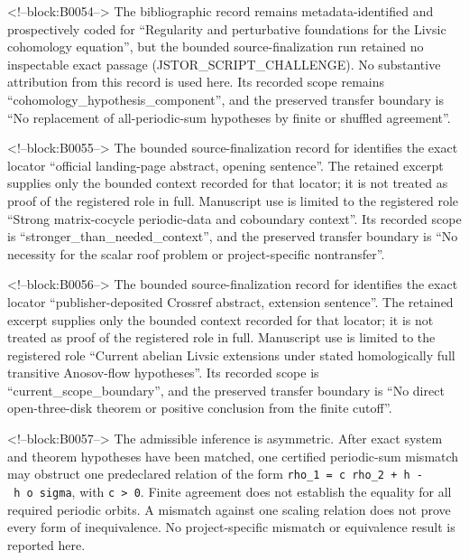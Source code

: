 \documentclass[11pt,a4paper]{article}
\begin{document}
<!--block:B0054-->
The bibliographic record \citep{P30-S24} remains metadata-identified and
prospectively coded for ``Regularity and perturbative foundations for the Livsic cohomology equation'', but the bounded source-finalization
run retained no inspectable exact passage (JSTOR\_SCRIPT\_CHALLENGE).  No substantive
attribution from this record is used here.  Its recorded scope remains
``cohomology\_hypothesis\_component'', and the preserved transfer boundary is ``No replacement of all-periodic-sum hypotheses by finite or shuffled agreement''.

<!--block:B0055-->
The bounded source-finalization record for \citep{P30-S25} identifies
the exact locator ``official landing-page abstract, opening sentence''.  The retained excerpt supplies only the
bounded context recorded for that locator; it is not treated as proof of the
registered role in full.  Manuscript use is limited to the registered role ``Strong matrix-cocycle periodic-data and coboundary context''.
Its recorded scope is ``stronger\_than\_needed\_context'', and the preserved
transfer boundary is ``No necessity for the scalar roof problem or project-specific nontransfer''.

<!--block:B0056-->
The bounded source-finalization record for \citep{P30-S26} identifies
the exact locator ``publisher-deposited Crossref abstract, extension sentence''.  The retained excerpt supplies only the
bounded context recorded for that locator; it is not treated as proof of the
registered role in full.  Manuscript use is limited to the registered role ``Current abelian Livsic extensions under stated homologically full transitive Anosov-flow hypotheses''.
Its recorded scope is ``current\_scope\_boundary'', and the preserved
transfer boundary is ``No direct open-three-disk theorem or positive conclusion from the finite cutoff''.

<!--block:B0057-->
The admissible inference is asymmetric. After exact system and theorem hypotheses have been matched, one certified periodic-sum mismatch may obstruct one predeclared relation of the form \texttt{rho\_1\ =\ c\ rho\_2\ +\ h\ -\ h\ o\ sigma}, with \texttt{c\ \textgreater{}\ 0}. Finite agreement does not establish the equality for all required periodic orbits. A mismatch against one scaling relation does not prove every form of inequivalence. No project-specific mismatch or equivalence result is reported here.
\end{document}
